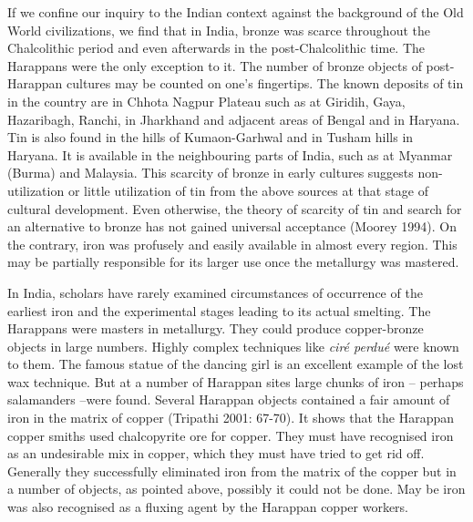 {If we confine our inquiry to the Indian context against the background of the Old World civilizations, we find that in India, bronze was scarce throughout the Chalcolithic period and even afterwards in the post-Chalcolithic time. The Harappans were the only exception to it. The number of bronze objects of post-Harappan cultures may be counted on one’s fingertips. The known deposits of tin in the country are in Chhota Nagpur Plateau such as at Giridih, Gaya, Hazaribagh, Ranchi, in Jharkhand and adjacent areas of Bengal and in Haryana. Tin is also found in the hills of Kumaon-Garhwal and in Tusham hills in Haryana. It is available in the neighbouring parts of India, such as at Myanmar (Burma) and Malaysia. This scarcity of bronze in early cultures suggests non-utilization or little utilization of tin from the above sources at that stage of cultural development. Even otherwise, the theory of scarcity of tin and search for an alternative to bronze has not gained universal acceptance (Moorey 1994). On the contrary, iron was profusely and easily available in almost every region. This may be partially responsible for its larger use once the metallurgy was mastered.

In India, scholars have rarely examined circumstances of occurrence of the earliest iron and the experimental stages leading to its actual smelting. The Harappans were masters in metallurgy. They could produce copper-bronze objects in large numbers. Highly complex techniques like \textit{ciré perdué} were known to them. The famous statue of the dancing girl is an excellent example of the lost wax technique. But at a number of Harappan sites large chunks of iron – perhaps salamanders –were found. Several Harappan objects contained a fair amount of iron in the matrix of copper (Tripathi 2001: 67-70). It shows that the Harappan copper smiths used chalcopyrite ore for copper. They must have recognised iron as an undesirable mix in copper, which they must have tried to get rid off. Generally they successfully eliminated iron from the matrix of the copper but in a number of objects, as pointed above, possibly it could not be done. May be iron was also recognised as a fluxing agent by the Harappan copper workers.

}
